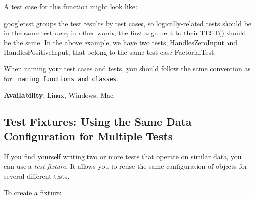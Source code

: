 \begin{DoxyCode}{0}
\end{DoxyCode}


A test case for this function might look like\+:


\begin{DoxyCode}{0}
\DoxyCodeLine{\}}
\DoxyCodeLine{}
\DoxyCodeLine{\}}
\end{DoxyCode}


googletest groups the test results by test cases, so logically-\/related tests should be in the same test case; in other words, the first argument to their {\ttfamily \mbox{\hyperlink{gtest_8h_ad8b332753515c0ab8baada563c2547eb}{T\+E\+S\+T()}}} should be the same. In the above example, we have two tests, {\ttfamily Handles\+Zero\+Input} and {\ttfamily Handles\+Positive\+Input}, that belong to the same test case {\ttfamily Factorial\+Test}.

When naming your test cases and tests, you should follow the same convention as for \href{https://google.github.io/styleguide/cppguide.html\#Function_Names}{\texttt{ naming functions and classes}}.

{\bfseries{Availability}}\+: Linux, Windows, Mac.

\subsection*{Test Fixtures\+: Using the Same Data Configuration for Multiple Tests}

If you find yourself writing two or more tests that operate on similar data, you can use a {\itshape test fixture}. It allows you to reuse the same configuration of objects for several different tests.

To create a fixture\+:



